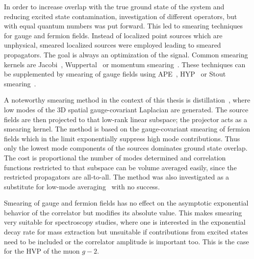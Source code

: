 In order to increase overlap with the true ground state of the system and reducing excited state contamination, investigation of different operators, but with equal quantum numbers was put forward.
This led to smearing techniques for gauge and fermion fields.
Instead of localized point sources which are unphysical, smeared localized sources were employed leading to smeared propagators.
The goal is always an optimization of the signal.
Common smearing kernels are Jacobi~\cite{GUSKEN1989,PhysRevD.56.2743,Collins:1992fj,UKQCD:1993gym}, Wuppertal~\cite{GUSKEN1990361} or momentum smearing~\cite{Bali:2016lva}.
These techniques can be supplemented by smearing of gauge fields using APE~\cite{ALBANESE1987163}, HYP~\cite{Hasenfratz:2001hp} or Stout smearing~\cite{PhysRevD.69.054501}.


A noteworthy smearing method in the context of this thesis is distillation~\cite{HadronSpectrum:2009krc,Knechtli:2022bji}, where low modes of the 3D spatial gauge-covariant Laplacian are generated.
The source fields are then projected to that low-rank linear subspace; the projector acts as a smearing kernel.
The method is based on the gauge-covariant smearing of fermion fields which in the limit exponentially suppress high mode contributions.
Thus only the lowest mode components of the sources dominates ground state overlap.
The cost is proportional the number of modes determined and correlation functions restricted to that subspace can be volume averaged easily, since the restricted propagators are all-to-all.
The method was also investigated as a substitute for low-mode averaging~\cite{Bushnaq:2023} with no success.

Smearing of gauge and fermion fields has no effect on the asymptotic exponential behavior of the correlator but modifies its absolute value.
This makes smearing very suitable for spectroscopy studies, where one is interested in the exponential decay rate for mass extraction but unsuitable if contributions from excited states need to be included or the correlator amplitude is important too.
This is the case for the HVP of the muon $g-2$.

